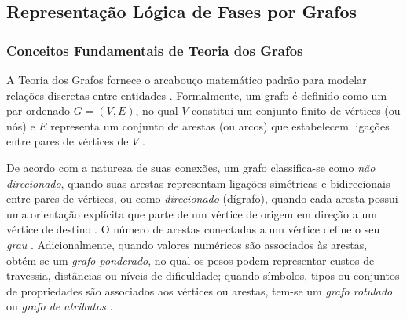 \subsection{Representação Lógica de Fases por Grafos}
\label{sec:grafos}

\subsubsection{Conceitos Fundamentais de Teoria dos Grafos}
\label{sec:conceitos_grafos}

A Teoria dos Grafos fornece o arcabouço matemático padrão para modelar relações discretas entre entidades \cite{summerville2018procedural}. Formalmente, um grafo é definido como um par ordenado $G = (V, E)$, no qual $V$ constitui um conjunto finito de vértices (ou nós) e $E$ representa um conjunto de arestas (ou arcos) que estabelecem ligações entre pares de vértices de $V$ \cite{maleki2024procedural, yang2026codeasroomgenerating3drooms}.

De acordo com a natureza de suas conexões, um grafo classifica-se como \textit{não direcionado}, quando suas arestas representam ligações simétricas e bidirecionais entre pares de vértices, ou como \textit{direcionado} (dígrafo), quando cada aresta possui uma orientação explícita que parte de um vértice de origem em direção a um vértice de destino \cite{dormans2010, summerville2018procedural}. O número de arestas conectadas a um vértice define o seu \textit{grau} \cite{inproceedings, xu2025databasedrivenframework3dlevel}. Adicionalmente, quando valores numéricos são associados às arestas, obtém-se um \textit{grafo ponderado}, no qual os pesos podem representar custos de travessia, distâncias ou níveis de dificuldade; quando símbolos, tipos ou conjuntos de propriedades são associados aos vértices ou arestas, tem-se um \textit{grafo rotulado} ou \textit{grafo de atributos} \cite{dormans2010, inproceedings, linden2014dungeons, chen2025narrative}.


